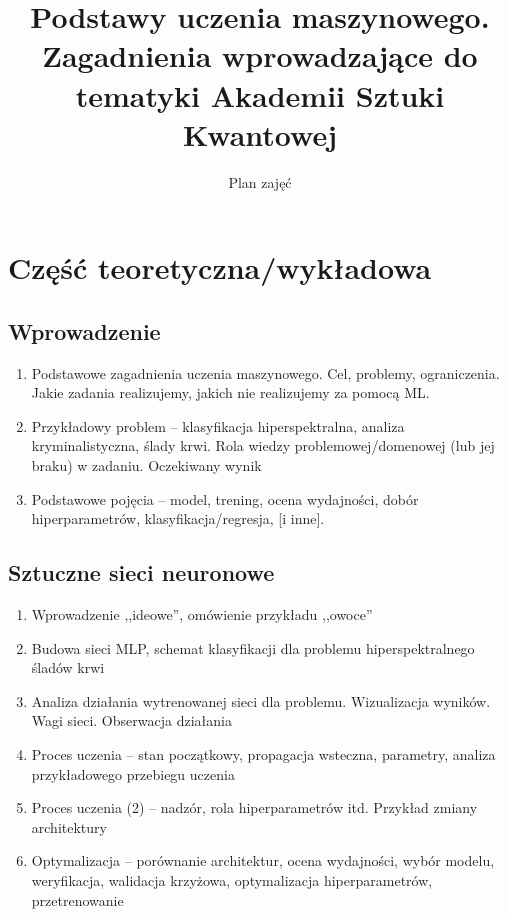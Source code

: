 \documentclass[10pt]{article}
\begin{document}
\title{Podstawy uczenia maszynowego. Zagadnienia wprowadzające do tematyki Akademii Sztuki Kwantowej}
\author{Plan zajęć}
\maketitle

\section*{Część teoretyczna/wykładowa}

\subsection*{Wprowadzenie}

\begin{enumerate}
	\item Podstawowe zagadnienia uczenia maszynowego. Cel, problemy, ograniczenia. Jakie zadania realizujemy, jakich nie realizujemy za pomocą ML.
	\item Przykładowy problem -- klasyfikacja hiperspektralna, analiza kryminalistyczna, ślady krwi. Rola wiedzy problemowej/domenowej (lub jej braku) w zadaniu. Oczekiwany wynik
	\item Podstawowe pojęcia -- model, trening, ocena wydajności, dobór hiperparametrów, klasyfikacja/regresja, [i inne].

\end{enumerate}

\subsection*{Sztuczne sieci neuronowe}

\begin{enumerate}
	\item Wprowadzenie ,,ideowe'', omówienie przykładu ,,owoce''
	\item Budowa sieci MLP, schemat klasyfikacji dla problemu hiperspektralnego śladów krwi
	\item Analiza działania wytrenowanej sieci dla problemu. Wizualizacja wyników. Wagi sieci. Obserwacja działania
	\item Proces uczenia -- stan początkowy, propagacja wsteczna, parametry, analiza przykładowego przebiegu uczenia
	\item Proces uczenia (2) -- nadzór, rola hiperparametrów itd. Przykład zmiany architektury
	\item Optymalizacja -- porównanie architektur, ocena wydajności, wybór modelu, weryfikacja, walidacja krzyżowa, optymalizacja hiperparametrów, przetrenowanie
\end{enumerate}
\end{document}
